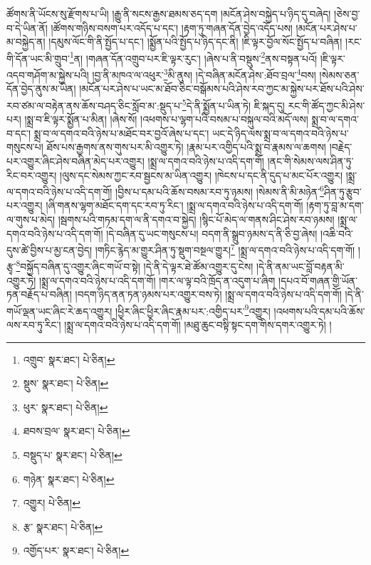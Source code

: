 ཚོགས་ནི་ཡོངས་སུ་རྫོགས་པ་ཡི། །རྒྱུ་ནི་སངས་རྒྱས་ཐམས་ཅད་དག །མངོན་ཤེས་བསྐྱེད་པ་ཉིད་དུ་བཞེད། །ཅེས་བྱ་བ་དེ་ཡིན་ནོ། །ཚོགས་གཉིས་བསག་པར་འདོད་པ་དང་། །རྟག་ཏུ་གཞན་དོན་བྱེད་འདོད་པས། །མངོན་པར་ཤེས་པ་མ་བསྐྱེད་ན། །དམུས་ལོང་གི་ནི་སྤྱོད་པ་དང་། །སྨྱོན་པའི་སྤྱོད་པ་ཉིད་དང་ནི། །ཇི་ལྟར་བྱོལ་སོང་སྤྱོད་པ་བཞིན། །རང་གི་དོན་ཡང་མི་གྲུབ་\footnote{འགྲུབ་  སྣར་ཐང་།  པེ་ཅིན། }ན། །གཞན་དོན་འགྲུབ་པར་ཇི་ལྟར་རུང་། །ཞེས་པ་ནི་བསྡུས་\footnote{སྡུས་  སྣར་ཐང་།  པེ་ཅིན། }ནས་བསྟན་པའོ། །ཇི་ལྟར་འདབ་གཤོག་མ་སྐྱེས་པའི། །བྱ་ནི་མཁའ་ལ་འཕུར་\footnote{ཕུར་  སྣར་ཐང་།  པེ་ཅིན། }མི་ནུས། །དེ་བཞིན་མངོན་ཤེས་:ཐོབ་བྲལ་\footnote{ཐབས་བྲལ་  སྣར་ཐང་།  པེ་ཅིན། }བས། །སེམས་ཅན་དོན་བྱེད་ནུས་མ་ཡིན། །མངོན་པར་ཤེས་པ་ཡང་མ་ཐོབ་ཅིང་བསྒོམས་པའི་ཤེས་རབ་ཀྱང་མ་སྐྱེས་པར་ཐོས་པའི་ཤེས་རབ་ཙམ་ལ་བརྟེན་ནས་ཆོས་བཤད་ཅིང་སློབ་མ་:སྡུད་པ་\footnote{བསྡུད་པ་  སྣར་ཐང་།  པེ་ཅིན། }དེ་ནི་སྨྱོན་པ་ཡིན་ཏེ། ཇི་སྐད་དུ། རང་གི་ཚོད་ཀྱང་མི་ཤེས་པར། །སྨྲ་བ་ཇི་ལྟར་སྨྱོན་པ་མིན། །ཞེས་སོ། །འཕགས་པ་ལྷག་པའི་བསམ་པ་བསྐུལ་བའི་མདོ་ལས། སྨྲ་བ་ལ་དགའ་བ་དང་། སྨྲ་བ་ལ་དགའ་བའི་ཉེས་པ་མཐོང་བར་བྱའོ་ཞེས་པ་དང་། ཡང་དེ་ཉིད་ལས་སྨྲ་བ་ལ་དགའ་བའི་ཉེས་པ་གསུངས་པ། ཐོས་པས་རྒྱགས་ནས་གུས་པར་མི་འགྱུར་ཏེ། །རྣམ་པར་འགྱིད་པའི་སྨྲ་བ་རྣམས་ལ་ཆགས། །བརྗེད་པར་འགྱུར་ཞིང་ཤེས་བཞིན་མེད་པར་འགྱུར། །སྨྲ་ལ་དགའ་བའི་ཉེས་པ་འདི་དག་གོ། །ནང་གི་སེམས་ལས་ཤིན་ཏུ་རིང་བར་འགྱུར། །ལུས་དང་སེམས་ཀྱང་རབ་སྦྱངས་མ་ཡིན་འགྱུར། །ཁེངས་པ་དང་ནི་དུད་པ་མང་པོར་འགྱུར། །སྨྲ་ལ་དགའ་བའི་ཉེས་པ་འདི་དག་གོ། །བྱིས་པ་དམ་པའི་ཆོས་བསམ་རབ་ཏུ་ཉམས། །སེམས་ནི་མི་མཉེན་\footnote{གཉེན་  སྣར་ཐང་།  པེ་ཅིན། }ཤིན་ཏུ་རྩུབ་པར་འགྱུར། །ཞི་གནས་ལྷག་མཐོང་དག་དང་རབ་ཏུ་རིང་། །སྨྲ་ལ་དགའ་བའི་ཉེས་པ་འདི་དག་གོ། །རྟག་ཏུ་བླ་མ་དག་ལ་གུས་པ་མེད། །སྦགས་པའི་གཏམ་དག་ལ་ནི་དགའ་བ་སྐྱེད། །སྙིང་པོ་མེད་ལ་གནས་ཤིང་ཤེས་རབ་ཉམས། །སྨྲ་ལ་དགའ་བའི་ཉེས་པ་འདི་དག་གོ། །དེ་བཞིན་དུ་ཡང་གསུངས་པ། བདག་ནི་སྒྲུབ་ཉམས་ད་ནི་ཅི་བྱ་ཞེས། །འཆི་བའི་དུས་ཚེ་བྱིས་པ་མྱ་ངན་བྱེད། །གཏིང་རྙེད་མ་གྱུར་ཤིན་ཏུ་སྡུག་བསྔལ་གྱུར།\footnote{འགྱུར།  པེ་ཅིན། } །སྨྲ་ལ་དགའ་བའི་ཉེས་པ་འདི་དག་གོ། །རྩྭ་\footnote{རྩ་  སྣར་ཐང་།  པེ་ཅིན། }བསྐྱོད་བཞིན་དུ་འགྱུར་ཞིང་གཡོ་བ་སྟེ། །དེ་ནི་དེ་ལྟར་ཐེ་ཚོམ་འགྱུར་དུ་ངེས། །དེ་ནི་ནམ་ཡང་བློ་བརྟན་མི་འགྱུར་ཏེ། །སྨྲ་ལ་དགའ་བའི་ཉེས་པ་འདི་དག་གོ། །གར་ལ་ལྟ་བའི་ཁྲོད་ན་འདུག་པ་ཞིག །དཔའ་བོ་གཞན་གྱི་ཡོན་ཏན་བརྗོད་པ་བཞིན། །བདག་ཉིད་ནན་ཏན་ཉམས་པར་འགྱུར་བས་ཏེ། །སྨྲ་ལ་དགའ་བའི་ཉེས་པ་འདི་དག་གོ། །དེ་ནི་གཡོ་ལྡན་ཡང་ཞིང་རེ་ཆད་འགྱུར། །ཕྱིར་ཞིང་ཕྱིར་ཞིང་རྣམ་པར་:འགྱིད་པར་\footnote{འགྱོད་པར་  སྣར་ཐང་།  པེ་ཅིན། }འགྱུར། །འཕགས་པའི་དམ་པའི་ཆོས་ལས་རབ་ཏུ་རིང་། །སྨྲ་ལ་དགའ་བའི་ཉེས་པ་འདི་དག་གོ། །མཐུ་ཆུང་བསྟི་སྟང་དག་གིས་དགར་འགྱུར་ཏེ། །
